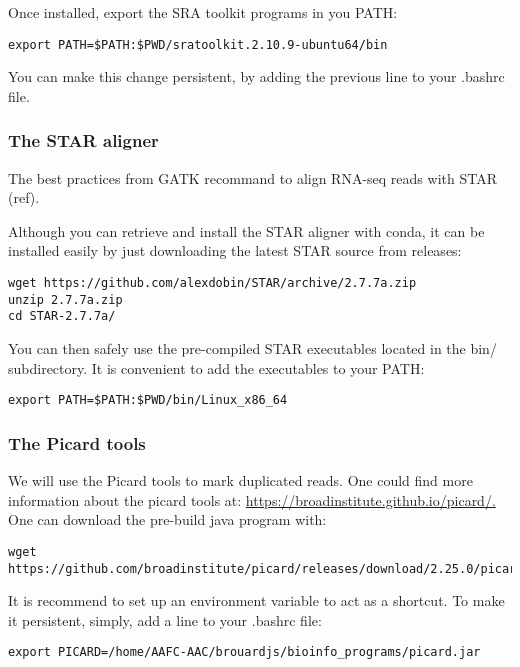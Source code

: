 Once installed, export the SRA toolkit programs in you PATH:

\begin{verbatim}
export PATH=$PATH:$PWD/sratoolkit.2.10.9-ubuntu64/bin
\end{verbatim}

You can make this change persistent, by adding the previous line to your .bashrc file.


\subsubsection{The STAR aligner}

The best practices from GATK recommand to align RNA-seq reads with STAR (ref). 

Although you can retrieve and install the STAR aligner with conda, it can be installed easily by just downloading the latest STAR source from releases:

\begin{verbatim} 
wget https://github.com/alexdobin/STAR/archive/2.7.7a.zip
unzip 2.7.7a.zip
cd STAR-2.7.7a/
\end{verbatim}

You can then safely use the pre-compiled STAR executables located in the bin/ subdirectory. It is convenient to add the executables to your PATH:

\begin{verbatim}
export PATH=$PATH:$PWD/bin/Linux_x86_64
\end{verbatim}



\subsubsection{The Picard tools}

We will use the Picard tools to mark duplicated reads. One could find more information about the picard tools at: 
\href{https://broadinstitute.github.io/picard/}{https://broadinstitute.github.io/picard/.} One can download the pre-build java program with:

\begin{verbatim}
wget https://github.com/broadinstitute/picard/releases/download/2.25.0/picard.jar
\end{verbatim}

It is recommend to set up an environment variable to act as a shortcut. To make it persistent, simply, add a line to your .bashrc file:

\begin{verbatim}
export PICARD=/home/AAFC-AAC/brouardjs/bioinfo_programs/picard.jar
\end{verbatim}

